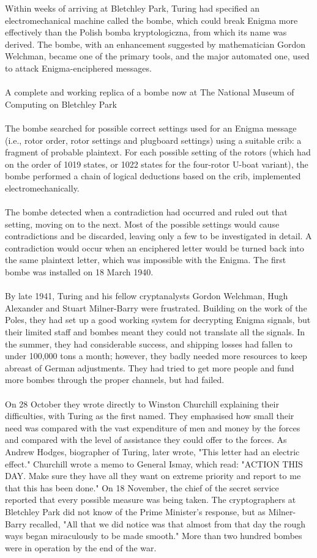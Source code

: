\documentclass{article}
\begin{document}
Within weeks of arriving at Bletchley Park, Turing had specified an electromechanical machine called the bombe, which could break Enigma more effectively than the Polish bomba kryptologiczna, from which its name was derived. The bombe, with an enhancement suggested by mathematician Gordon Welchman, became one of the primary tools, and the major automated one, used to attack Enigma-enciphered messages.
\\\\
A complete and working replica of a bombe now at The National Museum of Computing on Bletchley Park
\\\\
The bombe searched for possible correct settings used for an Enigma message (i.e., rotor order, rotor settings and plugboard settings) using a suitable crib: a fragment of probable plaintext. For each possible setting of the rotors (which had on the order of 1019 states, or 1022 states for the four-rotor U-boat variant), the bombe performed a chain of logical deductions based on the crib, implemented electromechanically.
\\\\
The bombe detected when a contradiction had occurred and ruled out that setting, moving on to the next. Most of the possible settings would cause contradictions and be discarded, leaving only a few to be investigated in detail. A contradiction would occur when an enciphered letter would be turned back into the same plaintext letter, which was impossible with the Enigma. The first bombe was installed on 18 March 1940.
\\\\
By late 1941, Turing and his fellow cryptanalysts Gordon Welchman, Hugh Alexander and Stuart Milner-Barry were frustrated. Building on the work of the Poles, they had set up a good working system for decrypting Enigma signals, but their limited staff and bombes meant they could not translate all the signals. In the summer, they had considerable success, and shipping losses had fallen to under 100,000 tons a month; however, they badly needed more resources to keep abreast of German adjustments. They had tried to get more people and fund more bombes through the proper channels, but had failed.
\\\\
On 28 October they wrote directly to Winston Churchill explaining their difficulties, with Turing as the first named. They emphasised how small their need was compared with the vast expenditure of men and money by the forces and compared with the level of assistance they could offer to the forces. As Andrew Hodges, biographer of Turing, later wrote, "This letter had an electric effect." Churchill wrote a memo to General Ismay, which read: "ACTION THIS DAY. Make sure they have all they want on extreme priority and report to me that this has been done." On 18 November, the chief of the secret service reported that every possible measure was being taken. The cryptographers at Bletchley Park did not know of the Prime Minister's response, but as Milner-Barry recalled, "All that we did notice was that almost from that day the rough ways began miraculously to be made smooth." More than two hundred bombes were in operation by the end of the war.
\end{document}
